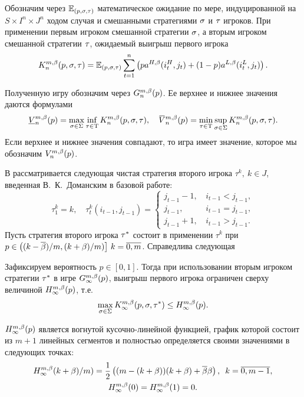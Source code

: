 Обозначим через $\operatorname{\mathbb{E}}_{(p,\sigma,\tau)}$ математическое ожидание по мере, индуцированной на $S \times I^n \times J^n$ ходом случая и смешанными стратегиями $\sigma$ и $\tau$ игроков.
При применении первым игроком смешанной стратегии $\sigma$, а вторым игроком смешанной стратегии $\tau$, ожидаемый выигрыш первого игрока
\begin{equation}
  \label{ch1:eq:firstPlayerPayoff}
  \K*{n}(p, \sigmar, \taur) = \E_{(p,\sigmar,\taur)} \sum_{t=1}^n
  \left(
    p \as[H](i_t^H, j_t) + (1 - p)\as[L](i_t^L, j_t)
  \right).
\end{equation}

Полученную игру обозначим через $\theG*{n}(p)$.
Ее верхнее и нижнее значения даются формулами
\begin{equation*}
  \LowV*{n}(p) = \max_{\sigmar \in \Sigma} \inf_{\taur \in \Tau}
  \K*{n}(p, \sigmar, \taur), \quad
  \HighV*{n}(p) = \min_{\taur \in \Tau} \sup_{\sigmar \in \Sigma}
  \K*{n}(p, \sigmar, \taur).
\end{equation*}
Если верхнее и нижнее значения совпадают, то игра имеет значение, которое мы обозначим $\V*{n}(p)$.

В  рассматривается следующая чистая стратегия второго игрока $\tau^k,\ k \in J$, введенная В.~К.~Доманским в базовой работе:
\[
  \tau^k_1 = k, \quad \tau^k_t(i_{t-1}, j_{t-1}) = \begin{cases}
    j_{t-1} - 1, & \, i_{t-1} < j_{t-1}, \\
    j_{t-1},     & \, i_{t-1} = j_{t-1}, \\
    j_{t-1} + 1, & \, i_{t-1} > j_{t-1}.
  \end{cases}
\]
Пусть стратегия второго игрока $\tau^*$ состоит в применении $\tau^k$ при $p \in \left( (k-{{\overline{\beta}}})/m, (k+\beta)/m) \right]\, k = \overline{0, m}$.
Справедлива следующая
\begin{theorem}
  Зафиксируем вероятность $p \in [0,1]$.
  Тогда при использовании вторым игроком стратегии $\tau^*$ в игре $\theG*{\infty}(p)$\textup{,} выигрыш первого игрока ограничен сверху величиной $\H*{\infty}(p)$, т.е.
  \[ 
    \max_{\sigmar \in \Sigma} \K*{\infty}(p, \sigmar, \taur^*) \leq \H*{\infty}(p).
  \]

  $\H*{\infty}(p)$ является вогнутой кусочно-линейной функцией, график которой состоит из $m+1$ линейных сегментов и полностью определяется своими значениями в следующих точках\textup{:}
  \begin{gather*}
    \H*{\infty}(k+\Co)/m) = \frac{1}{2} \left( (m - (k + \Co))(k + \Co) + \DCo\Co \right),\enskip
    k = \overline{0, m - 1},\\
    \H*{\infty}(0) = \H*{\infty}(1) = 0.
  \end{gather*}
\end{theorem}

